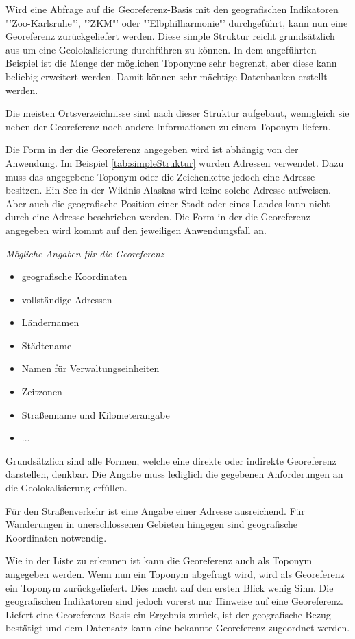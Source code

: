 		Wird eine Abfrage auf die Georeferenz-Basis mit den geografischen Indikatoren "'Zoo-Karlsruhe"', "'ZKM"' oder "'Elbphilharmonie"' durchgeführt, kann nun eine Georeferenz zurückgeliefert werden.
		Diese simple Struktur reicht grundsätzlich aus um eine Geolokalisierung durchführen zu können.
		In dem angeführten Beispiel ist die Menge der möglichen Toponyme sehr begrenzt, aber diese kann beliebig erweitert werden.
		Damit können sehr mächtige Datenbanken erstellt werden.

		Die meisten Ortsverzeichnisse sind nach dieser Struktur aufgebaut, wenngleich sie neben der Georeferenz noch andere Informationen zu einem Toponym liefern.

		Die Form in der die Georeferenz angegeben wird ist abhängig von der Anwendung. 
		Im Beispiel \ref{tab:simpleStruktur} wurden Adressen verwendet. 
		Dazu muss das angegebene Toponym oder die Zeichenkette jedoch eine Adresse besitzen. 
		Ein See in der Wildnis Alaskas wird keine solche Adresse aufweisen.
		Aber auch die geografische Position einer Stadt oder eines Landes kann nicht durch eine Adresse beschrieben werden. 
		Die Form in der die Georeferenz angegeben wird kommt auf den jeweiligen Anwendungsfall an.
		
		\textit{Mögliche Angaben für die Georeferenz}

		\begin{itemize}
		  	 \item geografische Koordinaten
		  	 \item vollständige Adressen
		  	 \item Ländernamen
		  	 \item Städtename
		  	 \item Namen für Verwaltungseinheiten 
		  	 \item Zeitzonen
		  	 \item Straßenname und Kilometerangabe
		  	 \item ...
		  \end{itemize}  

	 	Grundsätzlich sind alle Formen, welche eine direkte oder indirekte Georeferenz darstellen, denkbar.
	 	Die Angabe muss lediglich die gegebenen Anforderungen an die Geolokalisierung erfüllen.

	  	Für den Straßenverkehr ist eine Angabe einer Adresse ausreichend.
		Für Wanderungen in unerschlossenen Gebieten hingegen sind geografische Koordinaten notwendig. 

		Wie in der Liste zu erkennen ist kann die Georeferenz auch als Toponym angegeben werden.
		Wenn nun ein Toponym abgefragt wird, wird als Georeferenz ein Toponym zurückgeliefert.
		Dies macht auf den ersten Blick wenig Sinn.
		Die geografischen Indikatoren sind jedoch vorerst nur Hinweise auf eine Georeferenz.
		Liefert eine Georeferenz-Basis ein Ergebnis zurück, ist der geografische Bezug bestätigt und dem Datensatz kann eine bekannte Georeferenz zugeordnet werden.		



